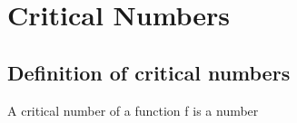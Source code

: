 
\setcounter{chapter}{1}
\chapter{Critical Numbers}

\section{Definition of critical numbers}
\begin{definition}
	A critical number of a function f is a number
\end{definition}